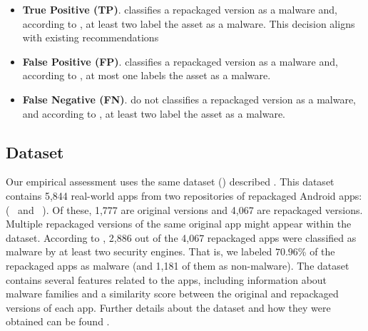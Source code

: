 \begin{itemize}
\item {\bf True Positive (TP)}. \droidxpflow classifies a repackaged version as a malware and, according to
  \vt, at least two \ses label the asset as a malware. This decision aligns with existing recommendations~\cite{vt-label,DBLP:journals/ese/KhanmohammadiEH19}
   
\item {\bf False Positive (FP)}. \droidxpflow classifies a repackaged version as a malware and, according to \vt, at most one \se labels the asset as a malware.

\item {\bf False Negative (FN)}. \droidxpflow do not classifies a repackaged version as a malware, and according to \vt, at least two \ses label the asset as a malware.
\end{itemize}



\subsection{Dataset}\label{sec:dataset}



Our empirical assessment uses the same dataset (\cds) described \pw. This dataset contains 5,844 real-world apps from two
repositories of repackaged Android apps:(\repack~\cite{DBLP:journals/tse/LiBK21} and \amc~\cite{rafiq2022andromalpack}). Of these,
1,777 are original versions and 4,067 are repackaged versions. Multiple repackaged versions of the same original app might
appear within the \cds dataset. According to \vt, 2,886 out of the 4,067 repackaged apps were classified as malware by at least two security engines. That
is, we labeled $70.96$\% of the repackaged apps as malware (and 1,181 of them as non-malware). The \cds dataset contains several
features related to the apps, including information about malware families and a similarity score between the original and repackaged versions of each app.
Further details about the \cds dataset and how they were obtained can be found \pw.

